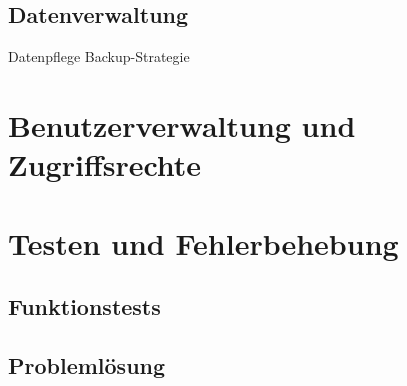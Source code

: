 \documentclass[12pt,a4paper]{report}
\begin{document}
  \subsection{Datenverwaltung}
    Datenpflege
    Backup-Strategie

\section{Benutzerverwaltung und Zugriffsrechte}
\section{Testen und Fehlerbehebung}
  \subsection{Funktionstests}
  \subsection{Problemlösung}
\end{document}

